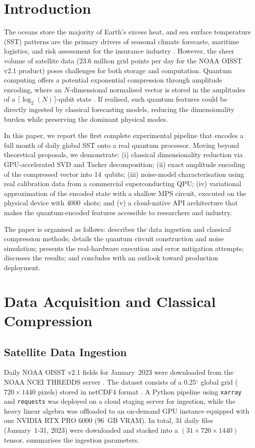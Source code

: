 \documentclass[12pt,a4paper]{article}
\newcommand{\iconlink}[2]{%
  \href{#1}{\raisebox{-0.12ex}{\tikz[baseline=-0.5ex]{\node[draw=gray!60, rounded corners=1pt,
    inner sep=1.5pt, minimum height=0.55cm, minimum width=0.55cm, fill=gray!5] {#2};}}}%
}
\newcommand{\noaalink}{\iconlink{https://doi.org/10.1175/2007JCLI1824.1}{NO}}
\begin{document}
\section{Introduction}
The oceans store the majority of Earth's excess heat, and sea surface temperature (SST) patterns are the primary drivers of seasonal climate forecasts, maritime logistics, and risk assessment for the insurance industry \cite{noaa_oisst}. However, the sheer volume of satellite data (23.6 million grid points per day for the NOAA OISST v2.1 product) poses challenges for both storage and computation. Quantum computing offers a potential exponential compression through amplitude encoding, where an $N$-dimensional normalised vector is stored in the amplitudes of a $\lceil \log_2(N) \rceil$-qubit state \cite{schuld2020}. If realised, such quantum features could be directly ingested by classical forecasting models, reducing the dimensionality burden while preserving the dominant physical modes.

In this paper, we report the first complete experimental pipeline that encodes a full month of daily global SST onto a real quantum processor. Moving beyond theoretical proposals, we demonstrate: (i) classical dimensionality reduction via GPU-accelerated SVD and Tucker decomposition; (ii) exact amplitude encoding of the compressed vector into 14~qubits; (iii) noise-model characterisation using real calibration data from a commercial superconducting QPU; (iv) variational approximation of the encoded state with a shallow MPS circuit, executed on the physical device with 4000~shots; and (v) a cloud-native API architecture that makes the quantum-encoded features accessible to researchers and industry.

The paper is organised as follows:  describes the data ingestion and classical compression methods;  details the quantum circuit construction and noise simulation;  presents the real-hardware execution and error mitigation attempts;  discusses the results; and  concludes with an outlook toward production deployment.

\section{Data Acquisition and Classical Compression}
\label{sec:data}

\subsection{Satellite Data Ingestion}
Daily NOAA OISST v2.1 fields for January~2023 were downloaded from the NOAA NCEI THREDDS server \noaalink. The dataset consists of a 0.25$^\circ$ global grid ($720\times1440$ pixels) stored in netCDF4 format \cite{noaa_oisst}. A Python pipeline using \texttt{xarray} and \texttt{requests} was deployed on a cloud staging server for ingestion, while the heavy linear algebra was offloaded to an on-demand GPU instance equipped with one NVIDIA RTX PRO 6000 (96~GB VRAM). In total, 31 daily files (January~1-31, 2023) were downloaded and stacked into a $(31\times720\times1440)$ tensor.  summarises the ingestion parameters.
\end{document}
